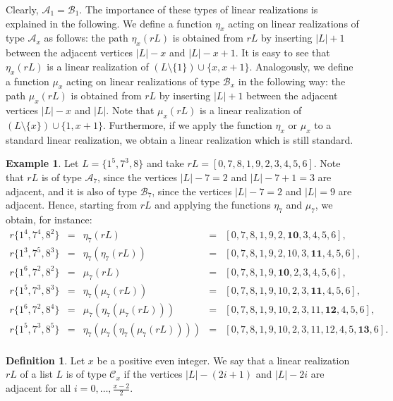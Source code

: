 \documentclass{amsart}
\theoremstyle{definition}
\newtheorem{defi}[prop]{Definition}
\newtheorem{ex}[prop]{Example}
\numberwithin{equation}{section}
\def\A{\mathcal{A}}
\def\B{\mathcal{B}}
\def\C{\mathcal{C}}
\begin{document}
Clearly, $\A_1=\B_1$.
The importance of these  types of linear realizations is explained in the following.
We define a function $\eta_x$ acting on linear realizations of type $\A_x$ as follows:
the path $\eta_x(rL)$ is obtained from $rL$ by inserting $|L|+1$ between the adjacent vertices $|L|-x$ and
$|L|-x+1$. It is easy to see that $\eta_x(rL)$ is a linear realization of $(L\setminus \{1\})\cup \{x,x+1 \}$.
Analogously, we define a function $\mu_x$ acting on linear realizations of type $\B_x$ in the following way:
the path $\mu_x(rL)$ is obtained from $rL$ by inserting $|L|+1$ between the adjacent vertices $|L|-x$ and
$|L|$. Note that  $\mu_x(rL)$ is a linear realization of $(L\setminus\{x\})\cup \{1, x+1\}$.
Furthermore, if we apply the function $\eta_x$  or $\mu_x$ to a standard linear realization, we obtain a linear realization
which is still standard.

\begin{ex}
Let $L=\{1^5, 7^3,8\}$ and take $rL=[0,7,8, 1,9, 2,3,4,5,6]$.
Note that $rL$ is of type $\A_7$, since the vertices $|L|-7=2$ and $|L|-7+1=3$ are adjacent, and it is also of type $\B_7$, since the vertices $|L|-7=2$ and $|L|=9$ are adjacent.
Hence, starting from $rL$ and applying the functions $\eta_7$ and $\mu_7$, we obtain, for instance:
$$\begin{array}{rcccl}
r\{1^4,7^4,8^2\} & =& \eta_7(rL) & = &[0,7,8, 1,9, 2,\bm{10},3,4,5,6],\\
r\{1^3,7^5,8^3\} & =& \eta_7(\eta_7(rL))& = &[0,7,8, 1,9, 2,10,3,\bm{11},4,5,6],\\
r\{1^6,7^2, 8^2 \} & = & \mu_7(rL) & = &[0,7,8, 1,9, \bm{10}, 2,3,4,5,6],\\
r\{1^5,7^3, 8^3 \} & =& \eta_7(\mu_7(rL)) & =&[0,7,8, 1,9, 10, 2,3,\bm{11},4,5,6],\\
r\{1^6,7^2, 8^4 \} & =& \mu_7(\eta_7(\mu_7(rL))) & = &[0,7,8, 1,9, 10, 2,3,11,\bm{12},4,5,6],\\
r\{1^5,7^3, 8^5 \} & =& \eta_7(\mu_7(\eta_7(\mu_7(rL)))) & = &[0,7,8, 1,9, 10, 2,3,11,12,4,5,\bm{13},6].\\
\end{array}$$
\end{ex}

\begin{defi}\label{def:Cx}
Let $x$ be a positive even integer. We say that a linear realization $rL$ of a list $L$ is
of type $\C_x$  if the vertices $|L|-(2i+1)$ and  $|L|-2i$ are adjacent for all
$i=0,\ldots,\frac{x-2}{2}$.
\end{defi}
\end{document}
